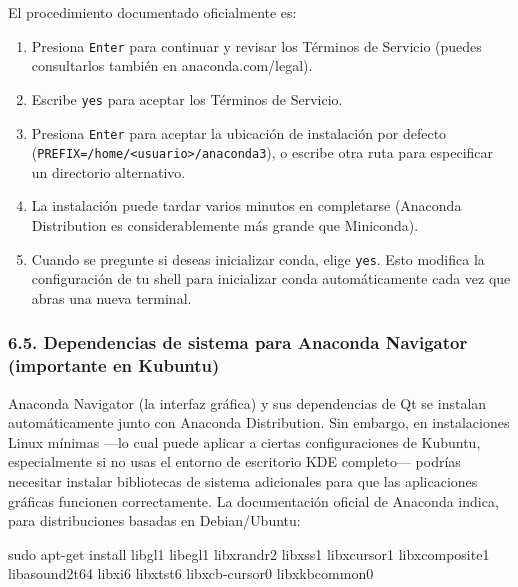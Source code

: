 \documentclass[
  doc,
  floatsintext,
  longtable,
  a4paper,
  nolmodern,
  notxfonts,
  notimes,
  12pt,
  colorlinks=true,linkcolor=blue,citecolor=blue,urlcolor=blue]{apa7}
\newenvironment{Shaded}{\begin{snugshade}}{\end{snugshade}}
\newcommand{\FunctionTok}[1]{\textcolor[rgb]{0.28,0.35,0.67}{#1}}
\newcommand{\NormalTok}[1]{\textcolor[rgb]{0.00,0.23,0.31}{#1}}
\providecommand{\tightlist}{%
  \setlength{\itemsep}{0pt}\setlength{\parskip}{0pt}}
\begin{document}
El procedimiento documentado oficialmente es:

\begin{enumerate}
\def\labelenumi{\arabic{enumi}.}
\tightlist
\item
  Presiona \texttt{Enter} para continuar y revisar los Términos de
  Servicio (puedes consultarlos también en anaconda.com/legal).
\item
  Escribe \texttt{yes} para aceptar los Términos de Servicio.
\item
  Presiona \texttt{Enter} para aceptar la ubicación de instalación por
  defecto
  (\texttt{PREFIX=/home/\textless{}usuario\textgreater{}/anaconda3}), o
  escribe otra ruta para especificar un directorio alternativo.
\item
  La instalación puede tardar varios minutos en completarse (Anaconda
  Distribution es considerablemente más grande que Miniconda).
\item
  Cuando se pregunte si deseas inicializar conda, elige \texttt{yes}.
  Esto modifica la configuración de tu shell para inicializar conda
  automáticamente cada vez que abras una nueva terminal.
\end{enumerate}

\subsubsection{6.5. Dependencias de sistema para Anaconda Navigator
(importante en
Kubuntu)}\label{dependencias-de-sistema-para-anaconda-navigator-importante-en-kubuntu}

Anaconda Navigator (la interfaz gráfica) y sus dependencias de Qt se
instalan automáticamente junto con Anaconda Distribution. Sin embargo,
en instalaciones Linux mínimas ---lo cual puede aplicar a ciertas
configuraciones de Kubuntu, especialmente si no usas el entorno de
escritorio KDE completo--- podrías necesitar instalar bibliotecas de
sistema adicionales para que las aplicaciones gráficas funcionen
correctamente. La documentación oficial de Anaconda indica, para
distribuciones basadas en Debian/Ubuntu:

\begin{Shaded}
\begin{Highlighting}[]
\FunctionTok{sudo}\NormalTok{ apt{-}get install libgl1 libegl1 libxrandr2 libxss1 libxcursor1 libxcomposite1 libasound2t64 libxi6 libxtst6 libxcb{-}cursor0 libxkbcommon0}
\end{Highlighting}
\end{Shaded}
\end{document}
